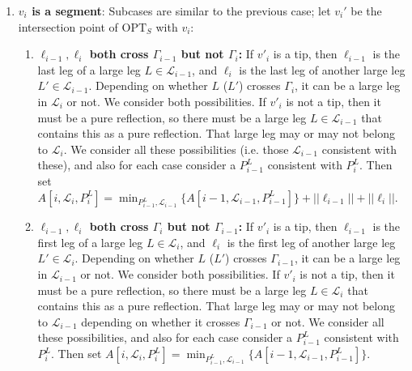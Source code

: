 \documentclass[10pt,a4paper]{amsart}
\theoremstyle{thmstyleone}
\newcommand{\OPT}{{\text{OPT}}}
\begin{document}
\begin{enumerate}
\begin{enumerate}
        \item \textbf{Exactly one of $\ell_{i-1},\ell_i$ crosses $\Gamma_{i-1}$ and one crosses $\Gamma_i$:}
        Say $\ell_{i-1}$ crosses $\Gamma_{i-1}$, and $\ell_i$ crosses $\Gamma_i$. So $\ell_{i-1}$ will be the last leg of a large leg $L\in\mathcal L_{i-1}$, and $\ell_i$ will be the first leg of a large leg $L'\in\mathcal L_i$. If $L$ does not cross $\Gamma_i$, then $L$ is not in $\mathcal L_i$ at all. Similarly, if $L'$ doesn't cross $\Gamma_{i-1}$, then $L'$ isn't a large leg in $\mathcal L_{i-1}$. We consider both possiblities (i.e. consider sets $\mathcal L_{i-1}$ that are consistent with one of these cases).
        $A[i,\mathcal L_i,P^L_i]=\min_{P^L_{i-1},\mathcal L_{i-1}} \{A[i-1,\mathcal L_{i-1},P^L_{i-1}]\}+||\ell_{i-1}||$.
    \end{enumerate}
    \item \textbf{$v_i$ is a segment}: Subcases are similar to the previous case; let $ v_i' $ be the intersection point of $ \OPT_S $ with $ v_i $:
    \begin{enumerate}
        \item \textbf{$\ell_{i-1},\ell_i$ both cross $\Gamma_{i-1}$ but not $\Gamma_i$:}
        If $v'_i$ is a tip, then $\ell_{i-1}$ is the last leg of a large leg $L\in\mathcal L_{i-1}$, and $\ell_i$ 
        is the last leg of another large leg $L'\in\mathcal L_{i-1}$. Depending on whether $L$ ($L'$) crosses $\Gamma_i$, it can be a large leg in $\mathcal L_i$ or not. We consider both possibilities.
        If $v'_i$ is not a tip, then it must be a pure reflection, so there must be a large leg $L\in\mathcal L_{i-1}$ that contains this as a pure reflection. That large leg may or may not belong to $\mathcal L_i$. We consider all these possibilities (i.e. those $\mathcal L_{i-1}$ consistent with these), and also for each case consider a $P^L_{i-1}$ consistent with $P^L_i$. Then set         
        $A[i,\mathcal L_i,P^L_i]=\min_{P^L_{i-1},\mathcal L_{i-1}} \{A[i-1,\mathcal L_{i-1},P^L_{i-1}]\}+||\ell_{i-1}||
        +||\ell_i||$.
        \item \textbf{$\ell_{i-1},\ell_i$ both cross $\Gamma_i$ but not $\Gamma_{i-1}$:}
        If $v'_i$ is a tip, then $\ell_{i-1}$ is the first leg of a large leg $L\in\mathcal L_{i}$, and $ \ell_i$ 
        is the first leg of another large leg $L'\in\mathcal L_{i}$. Depending on whether $L$ ($L'$) crosses $\Gamma_{i-1}$, it can be a large leg in $\mathcal L_{i-1}$ or not. We consider both possibilities.
        If $v'_i$ is not a tip, then it must be a pure reflection, so there must be a large leg $L\in\mathcal L_{i}$ that contains this as a pure reflection. That large leg may or may not belong to $\mathcal L_{i-1}$ depending on whether it crosses $\Gamma_{i-1}$ or not. We consider all these possibilities, and also for each case consider a $P^L_{i-1}$ consistent with $P^L_i$. Then set         
        $A[i,\mathcal L_i,P^L_i]=\min_{P^L_{i-1},\mathcal L_{i-1}} \{A[i-1,\mathcal L_{i-1},P^L_{i-1}]\}$.
        

\end{enumerate}
\end{enumerate}
\end{document}
